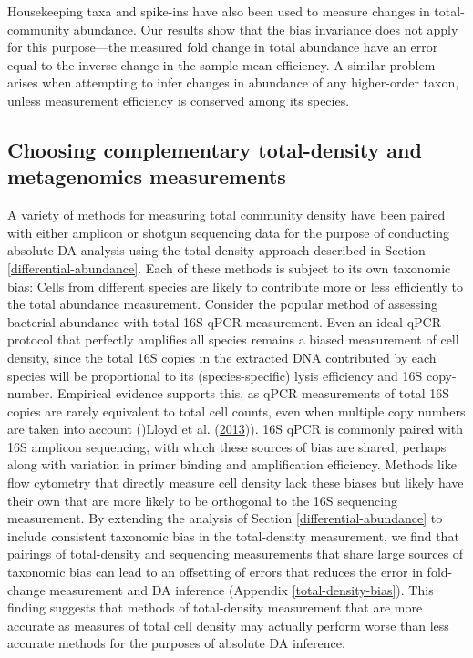 \documentclass[
]{article}
\begin{document}
Housekeeping taxa and spike-ins have also been used to measure changes in total-community abundance.
Our results show that the bias invariance does not apply for this purpose---the measured fold change in total abundance have an error equal to the inverse change in the sample mean efficiency.
A similar problem arises when attempting to infer changes in abundance of any higher-order taxon, unless measurement efficiency is conserved among its species.

\hypertarget{choosing-complementary-total-density-and-metagenomics-measurements}{%
\subsection{Choosing complementary total-density and metagenomics measurements}\label{choosing-complementary-total-density-and-metagenomics-measurements}}

A variety of methods for measuring total community density have been paired with either amplicon or shotgun sequencing data for the purpose of conducting absolute DA analysis using the total-density approach described in Section \ref{differential-abundance}.
Each of these methods is subject to its own taxonomic bias: Cells from different species are likely to contribute more or less efficiently to the total abundance measurement.
Consider the popular method of assessing bacterial abundance with total-16S qPCR measurement.
Even an ideal qPCR protocol that perfectly amplifies all species remains a biased measurement of cell density, since the total 16S copies in the extracted DNA contributed by each species will be proportional to its (species-specific) lysis efficiency and 16S copy-number.
Empirical evidence supports this, as qPCR measurements of total 16S copies are rarely equivalent to total cell counts, even when multiple copy numbers are taken into account ()Lloyd et al. (\protect\hyperlink{ref-lloyd2013meta}{2013})).
16S qPCR is commonly paired with 16S amplicon sequencing, with which these sources of bias are shared, perhaps along with variation in primer binding and amplification efficiency.
Methods like flow cytometry that directly measure cell density lack these biases but likely have their own that are more likely to be orthogonal to the 16S sequencing measurement.
By extending the analysis of Section \ref{differential-abundance} to include consistent taxonomic bias in the total-density measurement, we find that pairings of total-density and sequencing measurements that share large sources of taxonomic bias can lead to an offsetting of errors that reduces the error in fold-change measurement and DA inference (Appendix \ref{total-density-bias}).
This finding suggests that methods of total-density measurement that are more accurate as measures of total cell density may actually perform worse than less accurate methods for the purposes of absolute DA inference.
\end{document}
